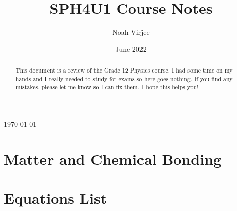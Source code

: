 \documentclass{article}
\title{SPH4U1 Course Notes}
\author{Noah Virjee}
\date{June 2022}
\begin{document}
\noindent\parbox{\linewidth}{%
\parbox{.7\linewidth}{\fontsize{24}{28}\selectfont\thetitle}\hfill%
\parbox{.3\linewidth}{\fontsize{12}{14}\selectfont\raggedleft\today\\\theauthor%
}}
\begin{abstract}
This document is a review of the Grade 12 Physics course. I had some time on my hands and I really needed to study for exams so here goes nothing. If you find any mistakes, please let me know so I can fix them. I hope this helps you!
\end{abstract}

\tableofcontents
\pagebreak

\section{Matter and Chemical Bonding}

\pagebreak
\appendix
\section{Equations List}
\end{document}
